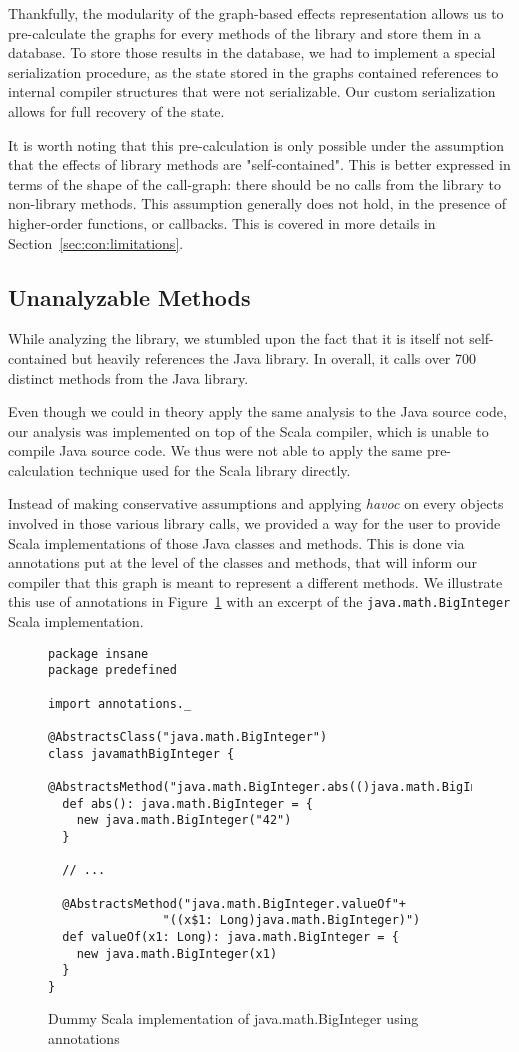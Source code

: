 Thankfully, the modularity of the graph-based effects representation allows us
to pre-calculate the graphs for every methods of the library and store them in
a database. To store those results in the database, we had to implement a
special serialization procedure, as the state stored in the graphs contained
references to internal compiler structures that were not serializable. Our custom
serialization allows for full recovery of the state.

It is worth noting that this pre-calculation is only possible under the
assumption that the effects of library methods are "self-contained". This is better
expressed in terms of the shape of the call-graph: there should be no calls
from the library to non-library methods. This assumption generally does not
hold, in the presence of higher-order functions, or callbacks. This is covered in more
details in Section~\ref{sec:con:limitations}.

\subsection{Unanalyzable Methods}
While analyzing the library, we stumbled upon the fact that it is itself not
self-contained but heavily references the Java library. In overall, it calls
over 700 distinct methods from the Java library.

Even though we could in theory apply the same analysis to the Java source code, our
analysis was implemented on top of the Scala compiler, which is unable to
compile Java source code. We thus were not able to apply the same
pre-calculation technique used for the Scala library directly.

Instead of making conservative assumptions and applying \emph{havoc} on every
objects involved in those various library calls, we provided a way for the user
to provide Scala implementations of those Java classes and methods. This is
done via annotations put at the level of the classes and methods, that will
inform our compiler that this graph is meant to represent a different methods.
We illustrate this use of annotations in Figure~\ref{fig:imp:annotations} with
an excerpt of the \verb=java.math.BigInteger= Scala implementation.
\begin{figure}[h]
    \centering
\begin{lstlisting}
package insane
package predefined

import annotations._

@AbstractsClass("java.math.BigInteger")
class javamathBigInteger {
  @AbstractsMethod("java.math.BigInteger.abs(()java.math.BigInteger)")
  def abs(): java.math.BigInteger = {
    new java.math.BigInteger("42")
  }

  // ...

  @AbstractsMethod("java.math.BigInteger.valueOf"+
                "((x$1: Long)java.math.BigInteger)")
  def valueOf(x1: Long): java.math.BigInteger = {
    new java.math.BigInteger(x1)
  }
}
\end{lstlisting}
    \caption{Dummy Scala implementation of java.math.BigInteger using annotations}
    \label{fig:imp:annotations}
\end{figure}
